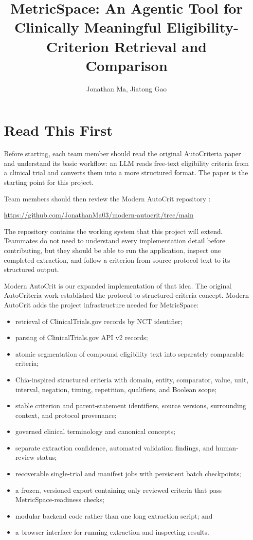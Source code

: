 \documentclass[11pt]{article}
\title{MetricSpace: An Agentic Tool for Clinically Meaningful Eligibility-Criterion Retrieval and Comparison}
\author{Jonathan Ma, Jiatong Gao}
\date{}
\begin{document}
\maketitle
\tableofcontents
\newpage

\section{Read This First}

Before starting, each team member should read the original AutoCriteria paper \cite{autocriteria} and understand its basic workflow: an LLM reads free-text eligibility criteria from a clinical trial and converts them into a more structured format. The paper is the starting point for this project.

Team members should then review the Modern AutoCrit repository \cite{modern-autocrit}:

\begin{center}
\url{https://github.com/JonathanMa03/modern-autocrit/tree/main}
\end{center}

The repository contains the working system that this project will extend. Teammates do not need to understand every implementation detail before contributing, but they should be able to run the application, inspect one completed extraction, and follow a criterion from source protocol text to its structured output.

Modern AutoCrit is our expanded implementation of that idea. The original AutoCriteria work established the protocol-to-structured-criteria concept. Modern AutoCrit adds the project infrastructure needed for MetricSpace:

\begin{itemize}
    \item retrieval of ClinicalTrials.gov records by NCT identifier;
    \item parsing of ClinicalTrials.gov API v2 records;
    \item atomic segmentation of compound eligibility text into separately comparable criteria;
    \item Chia-inspired structured criteria with domain, entity, comparator, value, unit, interval, negation, timing, repetition, qualifiers, and Boolean scope;
    \item stable criterion and parent-statement identifiers, source versions, surrounding context, and protocol provenance;
    \item governed clinical terminology and canonical concepts;
    \item separate extraction confidence, automated validation findings, and human-review status;
    \item recoverable single-trial and manifest jobs with persistent batch checkpoints;
    \item a frozen, versioned export containing only reviewed criteria that pass MetricSpace-readiness checks;
    \item modular backend code rather than one long extraction script; and
    \item a browser interface for running extraction and inspecting results.
\end{itemize}
\end{document}
